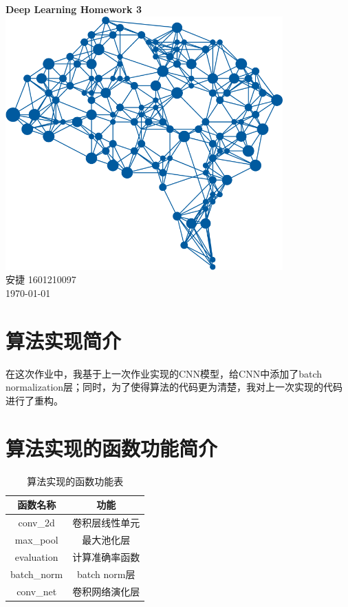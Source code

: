 \documentclass[a4paper, UTF8]{ctexrep}
\begin{document}
    \begin{titlepage}
        \centering
        \vspace{6cm}
        \LARGE{\textbf{Deep Learning Homework 3}}\\
        \vspace{4cm}
        \includegraphics[width=0.8\textwidth]{deepLearning.png}\\
        \vspace{4cm}
        \normalsize{安捷 1601210097}\\
        \normalsize{\today}
    \end{titlepage}
        \section{算法实现简介}
            在这次作业中，我基于上一次作业实现的CNN模型，给CNN中添加了batch normalization层；同时，为了使得算法的代码更为清楚，我对上一次实现的代码进行了重构。
        \section{算法实现的函数功能简介}
            \begin{table}[htbp!]
                \centering
                \begin{tabular}{cc}
                    \hline
                    函数名称 & 功能 \\
                    \hline
                    conv\_2d & 卷积层线性单元 \\
                    max\_pool & 最大池化层 \\
                    evaluation & 计算准确率函数 \\
                    batch\_norm & batch norm层 \\
                    conv\_net & 卷积网络演化层 \\
                    \hline
                \end{tabular}
                \caption{算法实现的函数功能表}
            \end{table}
\end{document}
